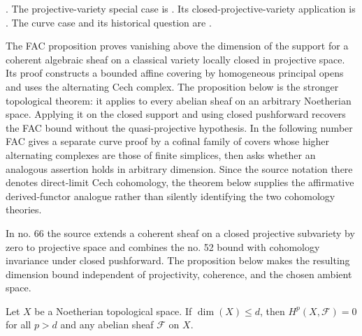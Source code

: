 \begin{proposition}[Grothendieck]
\label{proposition-vanishing-Noetherian}
\begin{reference}
\cite[Theorem 3.6.5]{Tohoku}.
The projective-variety special case is
\cite[Chapter III, \S 1, no. 52, Proposition 3 and Corollary,
pp. 244--245]{FAC}.
Its closed-projective-variety application is
\cite[Chapter III, \S 3, no. 66, Theorem 1, p. 259]{FAC}.
The curve case and its historical question are
\cite[Chapter III, \S 1, no. 53, Proposition 4 and Remark, p. 246]{FAC}.
\end{reference}
\begin{history}
The FAC proposition proves vanishing above the dimension of the support for a
coherent algebraic sheaf on a classical variety locally closed in projective
space. Its proof constructs a bounded affine covering by homogeneous
principal opens and uses the alternating Cech complex. The proposition below
is the stronger topological theorem: it applies to every abelian sheaf on an
arbitrary Noetherian space. Applying it on the closed support and using closed
pushforward recovers the FAC bound without the quasi-projective hypothesis.
In the following number FAC gives a separate curve proof by a cofinal family
of covers whose higher alternating complexes are those of finite simplices,
then asks whether an analogous assertion holds in arbitrary dimension. Since
the source notation there denotes direct-limit Cech cohomology, the theorem
below supplies the affirmative derived-functor analogue rather than silently
identifying the two cohomology theories.

In no. 66 the source extends a coherent sheaf on a closed projective
subvariety by zero to projective space and combines the no. 52 bound with
cohomology invariance under closed pushforward. The proposition below makes
the resulting dimension bound independent of projectivity, coherence, and
the chosen ambient space.
\end{history}
Let $X$ be a Noetherian topological space.
If $\dim(X) \leq d$, then $H^p(X, \mathcal{F}) = 0$
for all $p > d$ and any abelian sheaf $\mathcal{F}$
on $X$.
\end{proposition}

